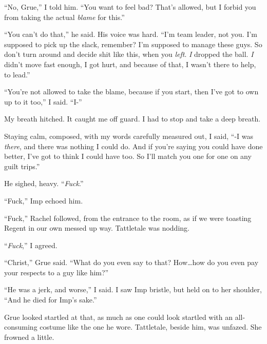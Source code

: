 ``No, Grue,'' I told him.  ``You want to feel bad?  That's allowed, but I forbid you from taking the actual \emph{blame} for this.''



``You can't do that,'' he said.  His voice was hard.  ``I'm team leader, not you.  I'm supposed to pick up the slack, remember?  I'm supposed to manage these guys.  So don't turn around and decide shit like this, when you \emph{left}.  \emph{I} dropped the ball.  \emph{I} didn't move fast enough, I got hurt, and because of that, I wasn't there to help, to lead.''



``You're not allowed to take the blame, because if you start, then I've got to own up to it too,'' I said.  ``I-''



My breath hitched.  It caught me off guard.  I had to stop and take a deep breath.



Staying calm, composed, with my words carefully measured out, I said, ``-I was \emph{there}, and there was nothing I could do.  And if you're saying you could have done better, I've got to think I could have too.  So I'll match you one for one on any guilt trips.''



He sighed, heavy.  ``\emph{Fuck}.''



``Fuck,'' Imp echoed him.



``Fuck,'' Rachel followed, from the entrance to the room, as if we were toasting Regent in our own messed up way.  Tattletale was nodding.



``\emph{Fuck},'' I agreed.



``Christ,'' Grue said.  ``What do you even say to that?  How\ldots how do you even pay your respects to a guy like him?''



``He was a jerk, and worse,'' I said.  I saw Imp bristle, but held on to her shoulder, ``And he died for Imp's sake.''



Grue looked startled at that, as much as one could look startled with an all-consuming costume like the one he wore.  Tattletale, beside him, was unfazed.  She frowned a little.



